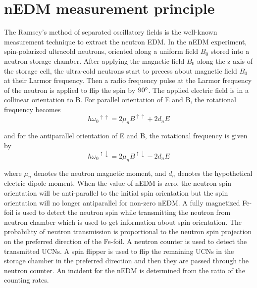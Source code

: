 \section{nEDM measurement principle}
The Ramsey's method of separated oscillatory fields is the well-known measurement technique
to extract the neutron EDM. In the nEDM experiment, spin-polarized ultracold neutrons, oriented along a uniform field $B_0$ stored into a neutron storage chamber. After applying the magnetic field $B_0$ along the z-axis of the storage cell, the ultra-cold neutrons start to precess about magnetic field $B_0$ at their Larmor frequency.  Then a radio frequency pulse at the Larmor frequency of the neutron is applied to flip the spin by $90 \degree$. The applied electric field is in a collinear orientation to B.  For parallel orientation of E and B, the rotational frequency becomes
\begin{equation}\label{my_first_eqn}  
    h{\omega_0}^ {\uparrow\uparrow}=2\mu_n {B}^{\uparrow\uparrow}+ 2 d_nE
\end{equation}
            
and for the antiparallel orientation of E and B, the rotational frequency is given by
\begin{equation}\label{my_first_eqn}  
    h{\omega_0}^ {\uparrow\downarrow}=2\mu_n {B}^{\uparrow\downarrow}- 2 d_nE
\end{equation}

where $\mu_n$ denotes the neutron magnetic moment, and $d_n$ denotes the hypothetical electric dipole moment. When the value of nEDM is zero, the neutron spin orientation will be anti-parallel to the initial spin orientation but the spin orientation will no longer antiparallel for non-zero nEDM. A fully magnetized Fe-foil is used to detect the neutron spin while transmitting the neutron from neutron chamber which is used to get information about spin orientation. The probability of neutron transmission is proportional to the neutron spin projection on the preferred direction of the Fe-foil. A neutron counter is used to detect the transmitted UCNs. A spin flipper is used to flip the remaining UCNs in the storage chamber in the preferred direction and then they are passed through the neutron counter. An incident for the nEDM is determined from the ratio of the counting rates.

